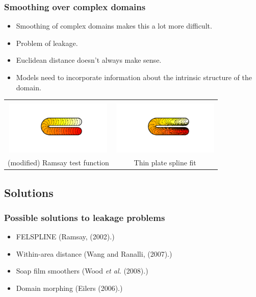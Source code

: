 \documentclass[ignorenonframetext]{beamer} %
\newcommand{\bc}{\begin{center}}
\newcommand{\ec}{\end{center}}
\newcommand{\bi}{\begin{itemize}}
\newcommand{\ei}{\end{itemize}}
\begin{document}
\begin{frame}
	\frametitle{Smoothing over complex domains}
       \bi
         \item Smoothing of complex domains makes this a lot more difficult.
         \item Problem of leakage.
         \item Euclidean distance doesn't always make sense.
         \item Models need to incorporate information about the intrinsic structure of the domain.
       \ei
       \bc\begin{tabular}{@{}cc}
          & \\
          \includegraphics[width=2in, trim=1in 1in 1in 1in]{figs/ramsayhorseshoe} & \includegraphics[width=2in, trim=1in 1in 1in 1in]{figs/leakageexample}\\
          (modified) Ramsay test function & Thin plate spline fit\\
       \end{tabular}\ec
\end{frame}

\subsection{Solutions}

\begin{frame}
	\frametitle{Possible solutions to leakage problems}
       \bi
         \item FELSPLINE (Ramsay, (2002).)
         \item Within-area distance (Wang and Ranalli, (2007).)
         \item Soap film smoothers (Wood \emph{et al.} (2008).) 
         \item Domain morphing (Eilers (2006).)
        \ei
\end{frame}
\end{document}

